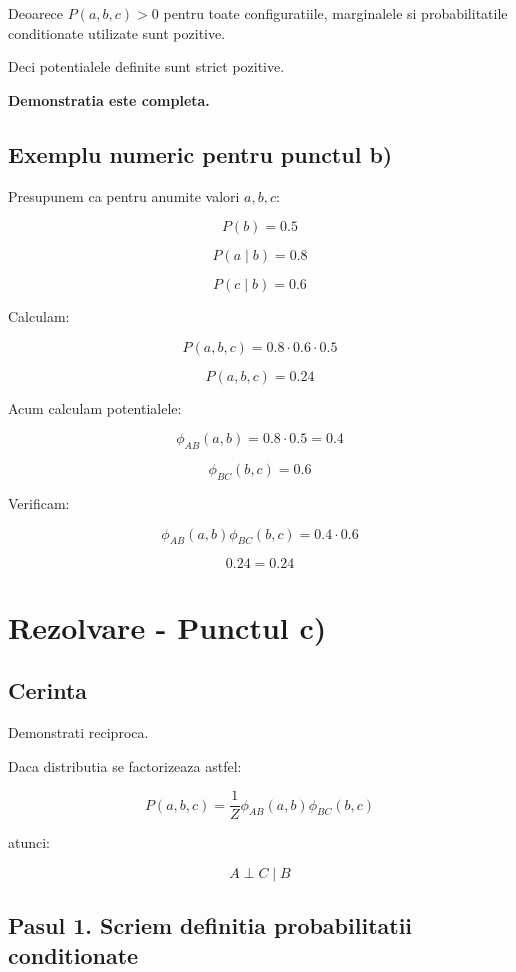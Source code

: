 \documentclass[12pt,a4paper]{article}
\begin{document}
Deoarece $P(a,b,c)>0$ pentru toate configuratiile, marginalele si probabilitatile conditionate utilizate sunt pozitive.

Deci potentialele definite sunt strict pozitive.

\textbf{Demonstratia este completa.}

\subsection*{Exemplu numeric pentru punctul b)}

Presupunem ca pentru anumite valori $a,b,c$:

\[
P(b)=0.5
\]

\[
P(a\mid b)=0.8
\]

\[
P(c\mid b)=0.6
\]

Calculam:

\[
P(a,b,c)=0.8\cdot0.6\cdot0.5
\]

\[
\boxed{P(a,b,c)=0.24}
\]

Acum calculam potentialele:

\[
\phi_{AB}(a,b)=0.8\cdot0.5=0.4
\]

\[
\phi_{BC}(b,c)=0.6
\]

Verificam:

\[
\phi_{AB}(a,b)\phi_{BC}(b,c)
=
0.4\cdot0.6
\]

\[
\boxed{0.24=0.24}
\]

\section{Rezolvare - Punctul c)}

\subsection*{Cerinta}

Demonstrati reciproca.

Daca distributia se factorizeaza astfel:

\[
P(a,b,c)=
\frac{1}{Z}\phi_{AB}(a,b)\phi_{BC}(b,c)
\]

atunci:

\[
\boxed{A\perp C\mid B}
\]

\subsection*{Pasul 1. Scriem definitia probabilitatii conditionate}
\end{document}
